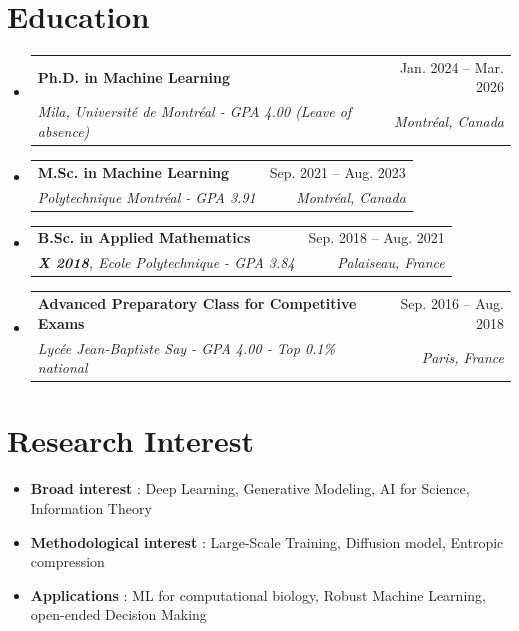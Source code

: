 \documentclass[letterpaper,11pt]{article}
\makeatletter
\newcommand{\resumeSubheading}[4]{
  \vspace{-2pt}\item
    \begin{tabular*}{0.97\textwidth}[t]{l@{\extracolsep{\fill}}r}
      \textbf{#1} & #2 \\
      \textit{\small#3} & \textit{\small #4} \\
    \end{tabular*}\vspace{-7pt}
}
\newcommand{\resumeSubHeadingListStart}{\begin{itemize}[leftmargin=0.15in, label={}]}
\newcommand{\resumeSubHeadingListEnd}{\end{itemize}}
\makeatother
\begin{document}
\section{Education}
  \resumeSubHeadingListStart
        \resumeSubheading
      {Ph.D. in Machine Learning}{Jan. 2024 -- Mar. 2026}
      {Mila, Université de Montréal - GPA 4.00 (Leave of absence)}{Montréal, Canada}
      \vspace{.2pt}
      \resumeSubheading
      {M.Sc. in Machine Learning}{Sep. 2021 -- Aug. 2023}
      {Polytechnique Montréal - GPA 3.91}{Montréal, Canada}
      \vspace{.2pt}
    \resumeSubheading
      {B.Sc. in Applied Mathematics}{Sep. 2018 -- Aug. 2021}
      {\textbf{X 2018}, Ecole Polytechnique - GPA 3.84}{Palaiseau, France}
    \resumeSubheading
      {Advanced Preparatory Class for Competitive Exams}{Sep. 2016 -- Aug. 2018}
      {Lycée Jean-Baptiste Say - GPA 4.00 - Top 0.1\% national}{Paris, France}
      
  \resumeSubHeadingListEnd
\section{Research Interest}
        \begin{itemize}
            \item \textbf{Broad interest} : Deep Learning, Generative Modeling, AI for Science, Information Theory
            \vspace{-5pt}
            \item \textbf{Methodological interest} : Large-Scale Training, Diffusion model, Entropic compression
            \vspace{-5pt}
            \item \textbf{Applications} : ML for computational biology, Robust Machine Learning, open-ended Decision Making
        \end{itemize}
\end{document}
